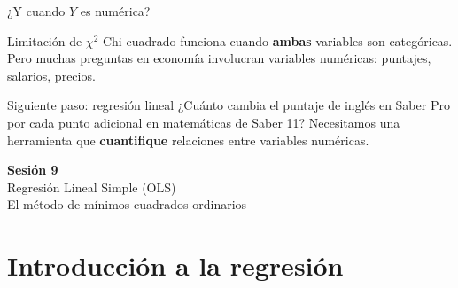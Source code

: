 \documentclass[aspectratio=169, 11pt]{beamer}
\begin{document}

\begin{frame}{¿Y cuando $Y$ es numérica?}
\begin{alertblock}{Limitación de $\chi^2$}
\small
Chi-cuadrado funciona cuando \textbf{ambas} variables son categóricas. Pero muchas preguntas en economía involucran variables numéricas: puntajes, salarios, precios.
\end{alertblock}

\vspace{0.3cm}
\begin{block}{Siguiente paso: regresión lineal}
¿Cuánto cambia el puntaje de inglés en Saber Pro por cada punto adicional en matemáticas de Saber 11? Necesitamos una herramienta que \textbf{cuantifique} relaciones entre variables numéricas.
\end{block}
\end{frame}


\begin{frame}{}
\vfill
\centering
{\Large\textbf{Sesión 9}}\\[1em]
{\normalsize Regresión Lineal Simple (OLS)}\\[0.5em]
{\small El método de mínimos cuadrados ordinarios}
\vfill
\end{frame}

\section{Introducción a la regresión}
\end{document}

